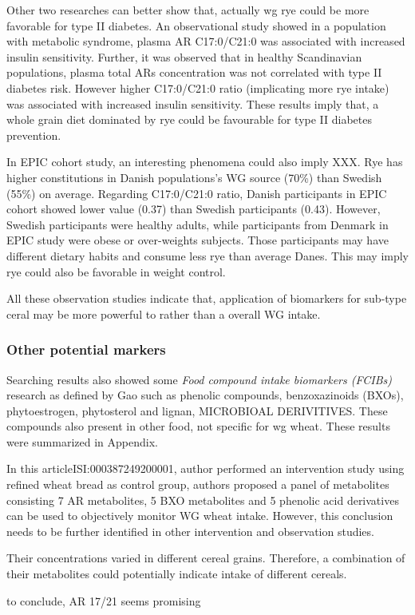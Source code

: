 Other two researches can better show that, actually \acrshort{wg} rye could be more favorable for type II diabetes.  An observational study showed in a population with metabolic syndrome, plasma AR C17:0/C21:0 was associated with increased insulin sensitivity\cite{ISI:000333777700008}. Further, it was observed that in healthy Scandinavian populations, plasma total ARs concentration was not correlated with type II diabetes risk. However higher C17:0/C21:0 ratio (implicating more rye intake) was associated with increased insulin sensitivity\cite{ISI:000378977200013}. These results imply that, a whole grain diet dominated by rye could be favourable for type II diabetes prevention. 

In EPIC cohort study, an interesting phenomena could also imply XXX. Rye has higher constitutions in Danish populations's WG source (70\%) than Swedish (55\%) on average. Regarding C17:0/C21:0 ratio, Danish participants in EPIC cohort showed lower value (0.37) than Swedish participants (0.43). 
However, Swedish participants were healthy adults, while participants from Denmark in EPIC study were obese or over-weights subjects. Those participants may have different dietary habits and consume less rye than average Danes. This may imply rye could also be favorable in weight control.

All these observation studies indicate that, application of biomarkers for sub-type ceral may be more powerful to rather than a overall WG intake.

\subsubsection{Other potential markers}
Searching results also showed some \textit{Food compound intake biomarkers (FCIBs)} research as defined by Gao\cite{Gao2017} such as phenolic compounds\cite{ISI:000389134200003}, benzoxazinoids (BXOs)\cite{ISI:000394168100034,ISI:000348343300015}, phytoestrogen\cite{ISI:000384082300001}, phytosterol and lignan\cite{ISI:000387249200001}, MICROBIOAL DERIVITIVES\cite{ISI:000348343300015}. These compounds also present in other food,  not specific for \acrshort{wg} wheat. These results were summarized in Appendix.

In this article{ISI:000387249200001}, author performed an intervention study using refined wheat bread as control group, authors proposed a panel of metabolites consisting 7 AR metabolites, 5 BXO metabolites and 5 phenolic acid derivatives can be used to objectively monitor WG wheat intake. However, this conclusion needs to be further identified in other intervention and observation studies.

Their concentrations varied in different cereal grains. Therefore, a combination of their metabolites could potentially indicate intake of different cereals.


to conclude, AR 17/21 seems promising 